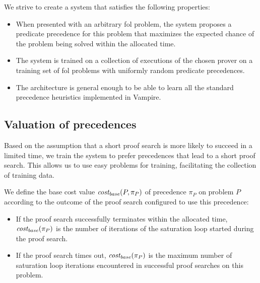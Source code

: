 We strive to create a system that satisfies the following properties:

\begin{itemize}
	\item When presented with an arbitrary \gls{fol} problem,
	the system proposes a predicate precedence for this problem
	that maximizes the expected chance of the problem being solved
	within the allocated time.
	
	
	\item The system is trained on a collection of executions of the chosen prover
	on a training set of \gls{fol} problems
	with uniformly random predicate precedences.
	
	\item The architecture is general enough to be able to learn
	all the standard precedence heuristics implemented in Vampire.\cite{?}
\end{itemize}


\subsection{Valuation of precedences}
\label{sec:precedence-valuation}

Based on the assumption that a short proof search is more likely to succeed in a limited time\cite{?},
we train the system to prefer precedences that lead to a short proof search.
This allows us to use easy problems for training, facilitating the collection of training data.

We define the base cost
value \(\operatorname{\mathit{cost_{base}}}(P, \pi_P)\) of precedence \(\pi_P\) on problem \(P\)
according to the outcome of the proof search configured to use this precedence:

\begin{itemize}
	\item If the proof search successfully terminates within the allocated time,
	\(\operatorname{\mathit{cost_{base}}}(\pi_P)\) is the number of iterations of the saturation loop
	started during the proof search.
	\item If the proof search times out, \(\operatorname{\mathit{cost_{base}}}(\pi_P)\) is the maximum number
	of saturation loop iterations encountered in successful proof searches on this problem.
\end{itemize}

